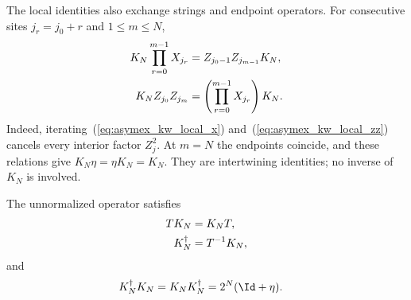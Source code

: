The local identities also exchange strings and endpoint operators.
For consecutive sites $j_r=j_0+r$ and $1\leq m\leq N$,
\begin{align}
    K_N\prod_{r=0}^{m-1}X_{j_r}
     & =Z_{j_0-1}Z_{j_{m-1}}K_N,
    \notag                                        \\
    K_NZ_{j_0}Z_{j_m}
     & =\left(\prod_{r=0}^{m-1}X_{j_r}\right)K_N.
    \label{eq:asymex_kw_strings}
\end{align}
Indeed, iterating~(\ref{eq:asymex_kw_local_x}) and~(\ref{eq:asymex_kw_local_zz})
cancels every interior
factor $Z_j^2$. At $m=N$ the endpoints coincide, and these relations
give $K_N\eta=\eta K_N=K_N$. They are intertwining identities; no
inverse of $K_N$ is involved.

\begin{lemma}
    \label{lem:asymex_kw_gram}
    \leanok
    The unnormalized operator satisfies
    \begin{align}
        TK_N        & =K_NT,
        \notag                    \\
        K_N^\dagger & =T^{-1}K_N,
        \label{eq:asymex_kw_adjoint}
    \end{align}
    and
    \begin{align}
        K_N^\dagger K_N=K_NK_N^\dagger & =2^N(\Id+\eta).
        \label{eq:asymex_kw_gram}
    \end{align}
\end{lemma}

